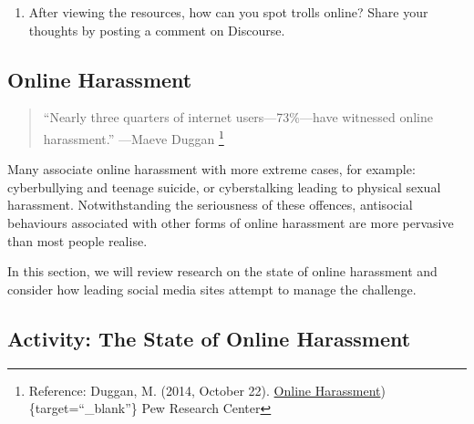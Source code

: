 \documentclass[
]{book}
\providecommand{\tightlist}{%
  \setlength{\itemsep}{0pt}\setlength{\parskip}{0pt}}
\theoremstyle{definition}
\theoremstyle{definition}
\theoremstyle{definition}
\theoremstyle{definition}
\theoremstyle{remark}
\begin{document}
\begin{reflect}
\begin{enumerate}
\def\labelenumi{\arabic{enumi}.}
\setcounter{enumi}{4}
\tightlist
\item
  After viewing the resources, how can you spot trolls online? Share your thoughts by posting a comment on Discourse.
\end{enumerate}
\end{reflect}

\hypertarget{online-harassment}{%
\subsection{Online Harassment}\label{online-harassment}}

\begin{quote}
``Nearly three quarters of internet users---73\%---have witnessed online harassment.''
---Maeve Duggan \footnote{Reference: Duggan, M. (2014, October 22). \href{https://www.pewresearch.org/internet/2014/10/22/online-harassment/}{Online Harassment})\{target=``\_blank''\} Pew Research Center}
\end{quote}

Many associate online harassment with more extreme cases, for example: cyberbullying and teenage suicide, or cyberstalking leading to physical sexual harassment. Notwithstanding the seriousness of these offences, antisocial behaviours associated with other forms of online harassment are more pervasive than most people realise.

In this section, we will review research on the state of online harassment and consider how leading social media sites attempt to manage the challenge.

\hypertarget{activity-the-state-of-online-harassment}{%
\subsection*{Activity: The State of Online Harassment}\label{activity-the-state-of-online-harassment}}
\end{document}
